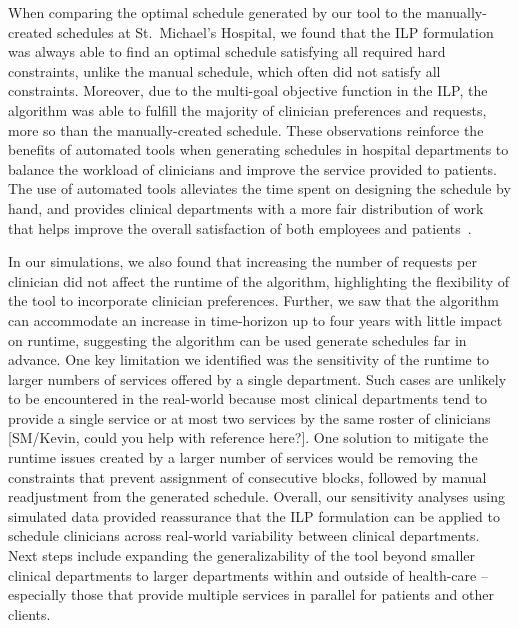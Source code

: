 When comparing the optimal schedule generated by our tool to the
manually-created schedules at St.\ Michael's Hospital, we found that the ILP
formulation was always able to find an optimal schedule satisfying all required
hard constraints, unlike the manual schedule, which often did not satisfy all
constraints. Moreover, due to the multi-goal objective function in
the ILP, the algorithm was able to fulfill the majority of clinician
preferences and requests, more so than the manually-created schedule. These
observations reinforce the benefits of automated tools when generating schedules
in hospital departments to balance the workload of clinicians and improve the
service provided to patients. The use of automated tools alleviates the time
spent on designing the schedule by hand, and provides clinical departments with
a more fair distribution of work that helps improve the overall satisfaction of
both employees and patients~\cite{silvestro_evaluation_2000}.  %

In our simulations, we also found that increasing the number of requests per
clinician did not affect the runtime of the algorithm, highlighting the
flexibility of the tool to incorporate clinician preferences. Further, we saw
that the algorithm can accommodate an increase in time-horizon up to four years
with little impact on runtime, suggesting the algorithm can be used generate
schedules far in advance. One key limitation we identified was the sensitivity
of the runtime to larger numbers of services offered by a single department.
Such cases are unlikely to be encountered in the real-world because most
clinical departments tend to provide a single service or at most two services by
the same roster of clinicians [{\color{red}SM/Kevin, could you help with
	reference here?}]. One solution to mitigate the runtime issues created by a
larger number of services would be removing the constraints that prevent
assignment of consecutive blocks, followed by manual readjustment from the
generated schedule. %
Overall, our sensitivity analyses using simulated data provided reassurance that
the ILP formulation can be applied to schedule clinicians across real-world
variability between clinical departments. %
Next steps include expanding the generalizability of the tool beyond smaller
clinical departments to larger departments within and outside of health-care --
especially those that provide multiple services in parallel for patients and
other clients. 
